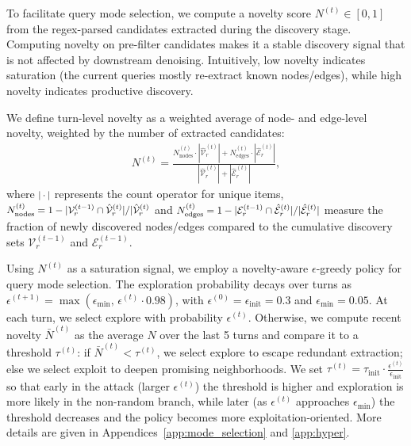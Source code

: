 To facilitate query mode selection, we compute a novelty score $N^{(t)}\in [0,1]$ from the regex-parsed candidates extracted during the discovery stage. Computing novelty on pre-filter candidates makes it a stable discovery signal that is not affected by downstream denoising. Intuitively, low novelty indicates saturation (the current queries mostly re-extract known nodes/edges), while high novelty indicates productive discovery.

We define turn-level novelty as a weighted average of node- and edge-level novelty, weighted by the number of extracted candidates:
\begin{align}
N^{(t)} = \frac{N_{\text{nodes}}^{(t)} \cdot |\hat{\mathcal{V}}_r^{(t)}| + N_{\text{edges}}^{(t)} \cdot |\hat{\mathcal{E}}_r^{(t)}|}{|\hat{\mathcal{V}}_r^{(t)}| + |\hat{\mathcal{E}}_r^{(t)}|},
\end{align}
where $\scalemath{0.8}{|\cdot|}$ represents the count operator for unique items, $\scalemath{0.9}{N_{\text{nodes}}^{(t)} = 1 - |\mathcal{V}_r^{(t-1)} \cap \hat{\mathcal{V}}_r^{(t)}|/|\hat{\mathcal{V}}_r^{(t)}}$ and $\scalemath{0.9}{N_{\text{edges}}^{(t)} = 1 - |\mathcal{E}_{r}^{(t-1)} \cap \hat{\mathcal{E}}_r^{(t)}|/|\hat{\mathcal{E}}_r^{(t)}|}$ measure the fraction of newly discovered nodes/edges compared to the cumulative discovery sets $\mathcal{V}_r^{(t-1)}$ and $\mathcal{E}_r^{(t-1)}$.

Using $N^{(t)}$ as a saturation signal, we employ a novelty-aware $\epsilon$-greedy policy for query mode selection. 
The exploration probability decays over turns as
$\epsilon^{(t+1)}=\max(\epsilon_{\min},\,\epsilon^{(t)}\cdot 0.98)$,
with $\epsilon^{(0)}=\epsilon_{\text{init}}=0.3$ and $\epsilon_{\min}=0.05$.
At each turn, we select \textsf{explore} with probability $\epsilon^{(t)}$.
Otherwise, we compute recent novelty $\bar{N}^{(t)}$ as the average $N$ over the last 5 turns and compare it to a threshold $\tau^{(t)}$:
if $\bar{N}^{(t)}<\tau^{(t)}$, we select \textsf{explore} to escape redundant extraction; else we select \textsf{exploit} to deepen promising neighborhoods.
We set $\tau^{(t)}=\tau_{\text{init}}\cdot \frac{\epsilon^{(t)}}{\epsilon_{\text{init}}}$ so that early in the attack (larger $\epsilon^{(t)}$) the threshold is higher and exploration is more likely in the non-random branch, while later (as $\epsilon^{(t)}$ approaches $\epsilon_{\min}$) the threshold decreases and the policy becomes more exploitation-oriented. More details are given in Appendices~\ref{app:mode_selection} and \ref{app:hyper}. %


